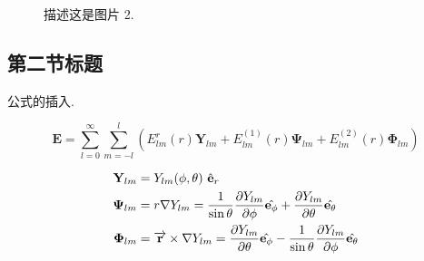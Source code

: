 \documentclass[UTF8, a4paper]{ctexart}
\numberwithin{equation}{section} %
\begin{document}
		\begin{figure}[ht]
			\centering
			\hspace{0in}
			\caption{描述这是图片 2.}
		\end{figure}

	\subsection{第二节标题}

		公式的插入.

		\begin{equation}
			\mathbf{E}=\sum_{l=0}^{\infty} \sum_{m=-l}^{l}\left(E_{l m}^{r}(r) \mathbf{Y}_{l m}+E_{l m}^{(1)}(r) \boldsymbol{\Psi}_{l m}+E_{l m}^{(2)}(r) \boldsymbol{\Phi}_{l m}\right)
		\end{equation}

		\begin{align}
			\mathbf{Y}_{l m}    & =Y_{l m}(\phi,\theta)\  \hat{\mathbf{e}}_r \\
			\notag
		    \boldsymbol{\Psi}_{l m} & =r \nabla Y_{l m}=\frac{1}{\sin \theta} \frac{\partial Y_{lm}}{\partial \phi}\hat{\mathbf{e}_{\phi}} + \frac{\partial Y_{lm}}{\partial \theta}\hat{\mathbf{e}_{\theta}} \\
		    \boldsymbol{\Phi}_{l m} & =\overrightarrow{\mathbf{r}} \times \nabla Y_{l m}=\frac{\partial Y_{lm}}{\partial \theta}\hat{\mathbf{e}_{\phi}} -\frac{1}{\sin \theta} \frac{\partial Y_{lm}}{\partial \phi}\hat{\mathbf{e}_{\theta}}
		\end{align}
\end{document}
